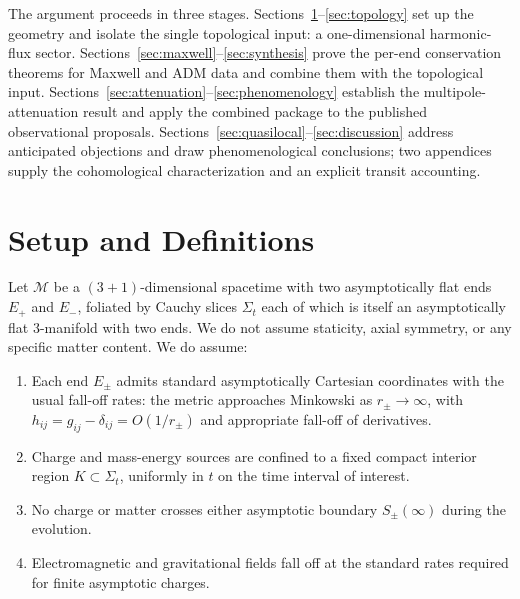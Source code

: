 \documentclass[aps,prd,onecolumn,nofootinbib,superscriptaddress]{revtex4-2}
\begin{document}
The argument proceeds in three stages. Sections~\ref{sec:setup}--\ref{sec:topology} set up the geometry and isolate the single topological input: a one-dimensional harmonic-flux sector. Sections~\ref{sec:maxwell}--\ref{sec:synthesis} prove the per-end conservation theorems for Maxwell and ADM data and combine them with the topological input. Sections~\ref{sec:attenuation}--\ref{sec:phenomenology} establish the multipole-attenuation result and apply the combined package to the published observational proposals. Sections~\ref{sec:quasilocal}--\ref{sec:discussion} address anticipated objections and draw phenomenological conclusions; two appendices supply the cohomological characterization and an explicit transit accounting.

\section{Setup and Definitions}
\label{sec:setup}

Let $\mathcal{M}$ be a $(3+1)$-dimensional spacetime with two asymptotically flat ends $E_+$ and $E_-$, foliated by Cauchy slices $\Sigma_t$ each of which is itself an asymptotically flat 3-manifold with two ends. We do not assume staticity, axial symmetry, or any specific matter content. We do assume:

\begin{enumerate}
    \item Each end $E_\pm$ admits standard asymptotically Cartesian coordinates with the usual fall-off rates: the metric approaches Minkowski as $r_\pm \to \infty$, with $h_{ij} = g_{ij} - \delta_{ij} = O(1/r_\pm)$ and appropriate fall-off of derivatives.\cite{ArnowittDeserMisner1962Dynamics,ReggeTeitelboim1974SurfaceIntegrals}
    \item Charge and mass-energy sources are confined to a fixed compact interior region $K \subset \Sigma_t$, uniformly in $t$ on the time interval of interest.
    \item No charge or matter crosses either asymptotic boundary $S_\pm(\infty)$ during the evolution.
    \item Electromagnetic and gravitational fields fall off at the standard rates required for finite asymptotic charges.
\end{enumerate}
\end{document}
